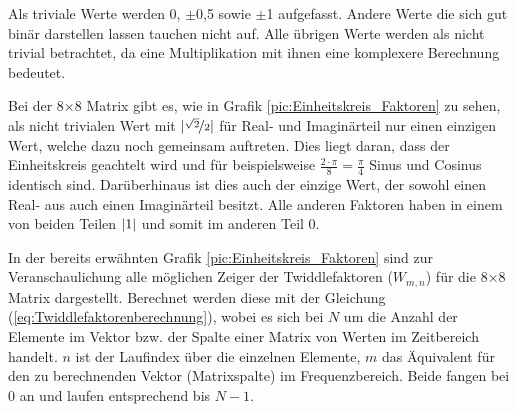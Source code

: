  
%  
 
 
 Als triviale Werte werden 0, $\pm$0,5 sowie $\pm$1 aufgefasst.
 Andere Werte die sich gut binär darstellen lassen
 tauchen nicht auf. Alle übrigen Werte werden als nicht trivial betrachtet, da eine Multiplikation mit ihnen
 eine komplexere Berechnung bedeutet.
 
 Bei der 8$\times$8 Matrix gibt es, wie in Grafik \ref{pic:Einheitskreis_Faktoren} zu sehen, als nicht trivialen Wert mit $\lvert\nicefrac{\sqrt{2}}{2}\rvert$ für Real- und 
 Imaginärteil nur einen einzigen Wert, welche dazu noch gemeinsam auftreten. Dies liegt daran, dass
 der Einheitskreis geachtelt wird und für beispielsweise $\frac{2\cdot\pi}{8}=\frac{\pi}{4}$ Sinus und Cosinus identisch sind. Darüberhinaus ist dies auch 
 der einzige Wert, der sowohl einen Real- aus auch einen Imaginärteil besitzt. Alle anderen Faktoren haben in einem von beiden Teilen $\lvert1\rvert$ und somit im anderen Teil 0.
 
 In der bereits erwähnten Grafik \ref{pic:Einheitskreis_Faktoren} sind zur Veranschaulichung alle möglichen Zeiger der Twiddlefaktoren ($W_{m,n}$) für die 8$\times$8 Matrix dargestellt. 
 Berechnet werden diese mit der
 Gleichung (\ref{eq:Twiddlefaktorenberechnung}), wobei es sich bei $N$ um die Anzahl der Elemente im Vektor bzw. der Spalte einer Matrix von Werten im Zeitbereich 
 handelt. $n$ ist der Laufindex über die einzelnen Elemente, $m$ das Äquivalent für den zu berechnenden Vektor (Matrixspalte) im Frequenzbereich. Beide 
 fangen bei 0 an und laufen entsprechend bis $N-1$.


